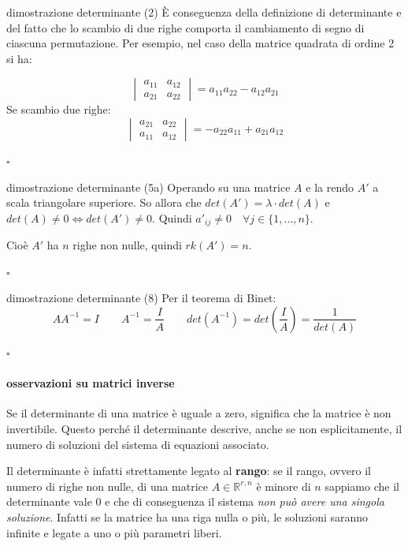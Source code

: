 \documentclass[x11names]{article}
\newcommand*{\QEDB}{\null\nobreak\hfill\ensuremath{\square}}%
\begin{document}
\begin{es}{dimostrazione determinante (2)}
È conseguenza della definizione di determinante e del fatto che lo scambio di due righe comporta il cambiamento di segno di ciascuna permutazione. Per esempio, nel caso della matrice quadrata di ordine 2 si ha:    

$$
\begin{vmatrix}
    a_{11} & a_{12} \\
    a_{21} & a_{22}
\end{vmatrix}
= a_{11}a_{22} - a_{12}a_{21}
$$
Se scambio due righe:
$$
\begin{vmatrix}
    a_{21} & a_{22} \\
    a_{11} & a_{12} 
\end{vmatrix}
= - a_{22}a_{11} + a_{21}a_{12}
$$

\QEDB
\end{es}
\begin{es}{dimostrazione determinante (5a)}
    Operando su una matrice $A$ e la rendo $A'$ a scala triangolare superiore. So allora che $det(A')=\lambda \cdot det(A)$ e $det(A) \neq 0 \Leftrightarrow det(A') \neq 0$.
    Quindi $a'_{ij} \neq 0 \quad \forall j \in \{1,\dots,n\}$.

    Cioè $A'$ ha $n$ righe non nulle, quindi $rk(A') = n$.

\QEDB
\end{es}
\begin{es}{dimostrazione determinante (8)} 
Per il teorema di Binet:
$$
AA^{-1} = I \qquad A^{-1} = \frac{I}{A} \qquad det(A^{-1}) = det(\frac{I}{A}) = \frac{1}{det(A)}
$$

\QEDB
\end{es}





\vspace{1em}
\noindent
\paragraph{osservazioni su matrici inverse}
Se il determinante di una matrice è uguale a zero, significa che la matrice è non invertibile. Questo perché il determinante descrive, anche se non esplicitamente, il numero di soluzioni del sistema di equazioni associato.

\noindent
Il determinante è infatti strettamente legato al \textbf{rango}: se il rango, ovvero il numero di righe non nulle, di una matrice $A \in \mathbb{R}^{r,n}$ è minore di $n$ sappiamo che il determinante vale $0$ e che di conseguenza il sistema\textit{ non può avere una singola soluzione}. Infatti se la matrice ha una riga nulla o più, le soluzioni saranno infinite e legate a uno o più parametri liberi.
\end{document}

